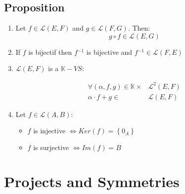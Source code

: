 \documentclass[notitlepage]{math}
\begin{document}
\subsection{Proposition}
\begin{enumerate}
    

    \item Let $f \in \mathcal{L}(E,F)$ and $g \in \mathcal{L}(F,G)$. Then: \[g \circ f \in \mathcal{L}(E,G)\]
    \item If $f$ is bijectif then $f{^{-1}}$ is bijective and $f{^{-1}} \in \mathcal{L}(F,E)$
    \item $\mathcal{L}(E,F)$ is a $\mathbb{K}-VS$:
        \newline
        \begin{minipage}{0.40\linewidth}
            
        \end{minipage}
        \hfill
        \begin{minipage}{0.59\linewidth}
            \begin{align*}
                \forall (\alpha, f, g) \in \mathbb{K} \times &\mathcal{L}^2(E,F) \\
                \alpha \cdot f + g \in &\mathcal{L}(E,F)
            \end{align*}
        \end{minipage}
    \item Let $f \in \mathcal{L}(A,B)$:
        \begin{itemize}
            \item $f$ is injective $ \Longleftrightarrow  Ker(f) = \left\{ 0_A \right\}$
            \item $f$ is surjective $ \Longleftrightarrow  Im(f) = B$
        \end{itemize}
\end{enumerate}
\section{Projects and Symmetries}
\end{document}
